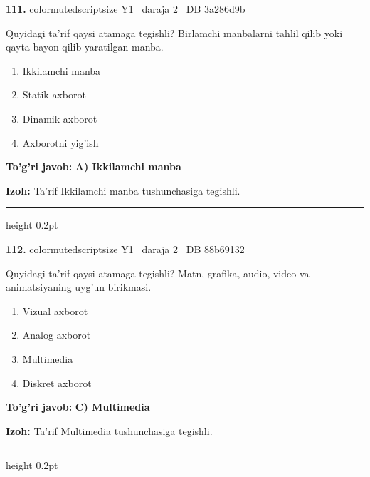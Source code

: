 \documentclass[10pt,a4paper,oneside]{article}
\begin{document}
\noindent\textbf{\color{ink}111.}  {color{muted}scriptsize Y1 \textbullet\ daraja 2 \textbullet\ DB 3a286d9b}
\par
Quyidagi ta'rif qaysi atamaga tegishli? Birlamchi manbalarni tahlil qilib yoki qayta bayon qilib yaratilgan manba.
\begin{enumerate}[label=\Alph*),leftmargin=9mm]
\item Ikkilamchi manba
\item Statik axborot
\item Dinamik axborot
\item Axborotni yig'ish
\end{enumerate}
\begin{tcolorbox}[enhanced,breakable,colback=teal!4,colframe=teal!50!black,boxrule=0.5pt,arc=1.1mm,left=3mm,right=3mm,top=1.7mm,bottom=1.7mm,before skip=2mm,after skip=2mm]
\textbf{\color{teal}To'g'ri javob:} \textbf{A) Ikkilamchi manba}
\par\smallskip
\textbf{Izoh:} Ta'rif Ikkilamchi manba tushunchasiga tegishli.
\end{tcolorbox}
\vspace{2mm}\hrule height 0.2pt \vspace{3mm}

\noindent\textbf{\color{ink}112.}  {color{muted}scriptsize Y1 \textbullet\ daraja 2 \textbullet\ DB 88b69132}
\par
Quyidagi ta'rif qaysi atamaga tegishli? Matn, grafika, audio, video va animatsiyaning uyg'un birikmasi.
\begin{enumerate}[label=\Alph*),leftmargin=9mm]
\item Vizual axborot
\item Analog axborot
\item Multimedia
\item Diskret axborot
\end{enumerate}
\begin{tcolorbox}[enhanced,breakable,colback=teal!4,colframe=teal!50!black,boxrule=0.5pt,arc=1.1mm,left=3mm,right=3mm,top=1.7mm,bottom=1.7mm,before skip=2mm,after skip=2mm]
\textbf{\color{teal}To'g'ri javob:} \textbf{C) Multimedia}
\par\smallskip
\textbf{Izoh:} Ta'rif Multimedia tushunchasiga tegishli.
\end{tcolorbox}
\vspace{2mm}\hrule height 0.2pt \vspace{3mm}
\end{document}
